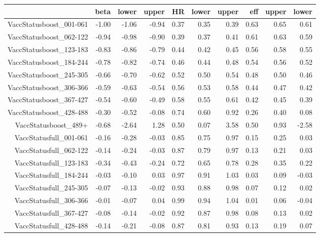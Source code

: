 \begin{table}[ht]
\centering
\begin{tabular}{rrrrrrrrrr}
  \hline
 & beta & lower & upper & HR & lower & upper & eff & upper & lower \\ 
  \hline
VaccStatusboost\_001-061 & -1.00 & -1.06 & -0.94 & 0.37 & 0.35 & 0.39 & 0.63 & 0.65 & 0.61 \\ 
  VaccStatusboost\_062-122 & -0.94 & -0.98 & -0.90 & 0.39 & 0.37 & 0.41 & 0.61 & 0.63 & 0.59 \\ 
  VaccStatusboost\_123-183 & -0.83 & -0.86 & -0.79 & 0.44 & 0.42 & 0.45 & 0.56 & 0.58 & 0.55 \\ 
  VaccStatusboost\_184-244 & -0.78 & -0.82 & -0.74 & 0.46 & 0.44 & 0.48 & 0.54 & 0.56 & 0.52 \\ 
  VaccStatusboost\_245-305 & -0.66 & -0.70 & -0.62 & 0.52 & 0.50 & 0.54 & 0.48 & 0.50 & 0.46 \\ 
  VaccStatusboost\_306-366 & -0.59 & -0.63 & -0.54 & 0.56 & 0.53 & 0.58 & 0.44 & 0.47 & 0.42 \\ 
  VaccStatusboost\_367-427 & -0.54 & -0.60 & -0.49 & 0.58 & 0.55 & 0.61 & 0.42 & 0.45 & 0.39 \\ 
  VaccStatusboost\_428-488 & -0.30 & -0.52 & -0.08 & 0.74 & 0.60 & 0.92 & 0.26 & 0.40 & 0.08 \\ 
  VaccStatusboost\_489+ & -0.68 & -2.64 & 1.28 & 0.50 & 0.07 & 3.58 & 0.50 & 0.93 & -2.58 \\ 
  VaccStatusfull\_001-061 & -0.16 & -0.28 & -0.03 & 0.85 & 0.75 & 0.97 & 0.15 & 0.25 & 0.03 \\ 
  VaccStatusfull\_062-122 & -0.14 & -0.24 & -0.03 & 0.87 & 0.79 & 0.97 & 0.13 & 0.21 & 0.03 \\ 
  VaccStatusfull\_123-183 & -0.34 & -0.43 & -0.24 & 0.72 & 0.65 & 0.78 & 0.28 & 0.35 & 0.22 \\ 
  VaccStatusfull\_184-244 & -0.03 & -0.10 & 0.03 & 0.97 & 0.91 & 1.03 & 0.03 & 0.09 & -0.03 \\ 
  VaccStatusfull\_245-305 & -0.07 & -0.13 & -0.02 & 0.93 & 0.88 & 0.98 & 0.07 & 0.12 & 0.02 \\ 
  VaccStatusfull\_306-366 & -0.01 & -0.07 & 0.04 & 0.99 & 0.94 & 1.04 & 0.01 & 0.06 & -0.04 \\ 
  VaccStatusfull\_367-427 & -0.08 & -0.14 & -0.02 & 0.92 & 0.87 & 0.98 & 0.08 & 0.13 & 0.02 \\ 
  VaccStatusfull\_428-488 & -0.14 & -0.21 & -0.08 & 0.87 & 0.81 & 0.93 & 0.13 & 0.19 & 0.07 \\ 

\end{tabular}
\end{table}
